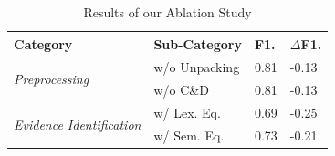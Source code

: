 \begin{table}[!t]
  \centering
  \footnotesize
  \caption{Results of our Ablation Study}\label{tab:ablation}
  \vspace{-9pt}
            \begin{tabular}{m{2.5cm}m{3cm}m{0.7cm}m{0.8cm}}   
            \toprule
            \textbf{Category} & \textbf{Sub-Category} & \textbf{F1.} & $\Delta$\textbf{F1.} \\ 
            \hline
            
            \multirow{2}{*}{\textit{Preprocessing}} 
            & w/o Unpacking  & 0.81 & -0.13 \\
            & w/o C\&D  & 0.81 & -0.13 \\
            \cmidrule(lr){2-4}
            \multirow{6}{*}{\textit{Evidence Identification}}
            & w/ Lex. Eq. & 0.69 & -0.25 \\
            & w/ Sem. Eq.  & 0.73 & -0.21 \\

\end{tabular}
\end{table}
